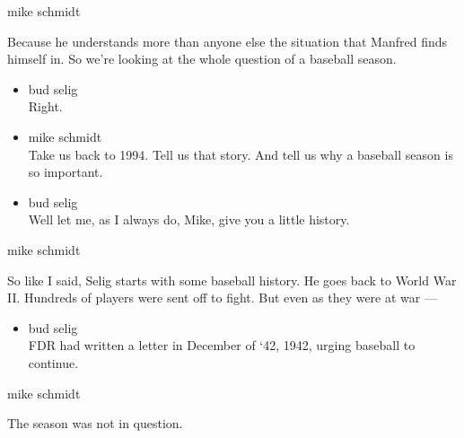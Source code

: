 mike schmidt

Because he understands more than anyone else the situation that Manfred
finds himself in. So we're looking at the whole question of a baseball
season.

\begin{itemize}
\item
  bud selig\\
  Right.
\item
  mike schmidt\\
  Take us back to 1994. Tell us that story. And tell us why a baseball
  season is so important.
\item
  bud selig\\
  Well let me, as I always do, Mike, give you a little history.
\end{itemize}

mike schmidt

So like I said, Selig starts with some baseball history. He goes back to
World War II. Hundreds of players were sent off to fight. But even as
they were at war ---

\begin{itemize}
\tightlist
\item
  bud selig\\
  FDR had written a letter in December of `42, 1942, urging baseball to
  continue.
\end{itemize}

mike schmidt

The season was not in question.

